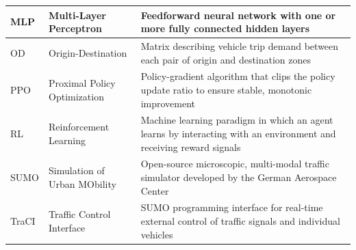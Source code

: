 \begin{longtable}{|m{2.5cm}|m{5.5cm}|m{6.5cm}|}
MLP   & Multi-Layer Perceptron & Feedforward neural network with one or more fully connected hidden layers \\ \hline
OD    & Origin-Destination & Matrix describing vehicle trip demand between each pair of origin and destination zones \\ \hline
PPO   & Proximal Policy Optimization & Policy-gradient algorithm that clips the policy update ratio to ensure stable, monotonic improvement \\ \hline
RL    & Reinforcement Learning & Machine learning paradigm in which an agent learns by interacting with an environment and receiving reward signals \\ \hline
SUMO  & Simulation of Urban MObility & Open-source microscopic, multi-modal traffic simulator developed by the German Aerospace Center \\ \hline
TraCI & Traffic Control Interface & SUMO programming interface for real-time external control of traffic signals and individual vehicles \\ \hline
\end{longtable}
